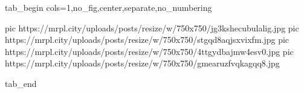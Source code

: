  
 
 
 
 


\ifcmt
  tab_begin cols=1,no_fig,center,separate,no_numbering

     pic https://mrpl.city/uploads/posts/resize/w/750x750/jg3kshecubulalig.jpg
		 pic https://mrpl.city/uploads/posts/resize/w/750x750/stgqd8aqjsxvixfm.jpg
		 pic https://mrpl.city/uploads/posts/resize/w/750x750/4ttgydbajmw4esv0.jpg
		 pic https://mrpl.city/uploads/posts/resize/w/750x750/gmearuzfvqkagqq8.jpg

  tab_end
\fi
